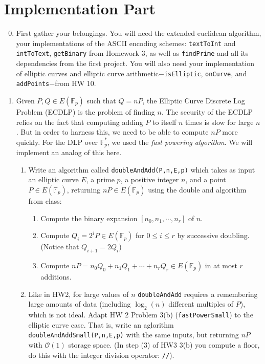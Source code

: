 \documentclass[11pt]{article}
\newcommand{\bF}{\mathbb{F}}
\newcommand{\cO}{\mathcal{O}}
\begin{document}
\section*{Implementation Part}
\begin{enumerate}
  \setcounter{enumi}{-1}
  \item{
  First gather your belongings.  You will need the extended euclidean algorithm, your implementations of the ASCII encoding schemes: \verb|textToInt| and \verb|intToText|, \verb|getBinary| from Homework 3, as well as \verb|findPrime| and all its dependencies from the first project.  You will also need your implementation of elliptic curves and elliptic curve arithmetic$-$\verb|isElliptic|, \verb|onCurve|, and \verb|addPoints|$-$from HW 10.
  }
  \item{
  Given $P,Q\in E(\bF_p)$ such that $Q = nP$, the Elliptic Curve Discrete Log Problem (ECDLP) is the problem of finding $n$.  The security of the ECDLP relies on the fact that computing adding $P$ to itself $n$ times is slow for large $n$.  But in order to harness this, we need to be able to compute $nP$ more quickly.  For the DLP over $\bF_p^*$, we used the \textit{fast powering algorithm}.  We will implement an analog of this here.
  \begin{enumerate}
    \item{
    Write an algorithm called \verb|doubleAndAdd(P,n,E,p)| which takes as input an elliptic curve $E$, a prime $p$, a positive integer $n$, and a point $P\in E(\bF_p)$, returning $nP\in E(\bF_p)$ using the double and algorithm from class:
    \begin{enumerate}[(1)]
      \item{Compute the binary expansion $[n_0,n_1,\cdots,n_r]$ of $n$.}
      \item{Compute $Q_i = 2^iP\in E(\bF_p)$ for $0\le i\le r$ by successive doubling.  (Notice that $Q_{i+1} = 2Q_i$)}
      \item{Compute $nP = n_0Q_0 + n_1Q_1 + \cdots + n_rQ_r\in E(\bF_p)$ in at most $r$ additions.}
    \end{enumerate}
    }
    \item{
    Like in HW2, for large values of $n$ \verb|doubleAndAdd| requires a remembering large amounts of data (including $\log_2(n)$ different multiples of $P$), which is not ideal.  Adapt HW 2 Problem 3(b) (\verb|fastPowerSmall|) to the elliptic curve case.  That is, write an aglorithm \verb|doubleAndAddSmall(P,n,E,p)| with the same inputs, but returning $nP$ with $\cO(1)$ storage space.  (In step (3) of HW3 3(b) you compute a floor, do this with the integer division operator: \verb|//|).
}
\end{enumerate}}
\end{enumerate}
\end{document}
